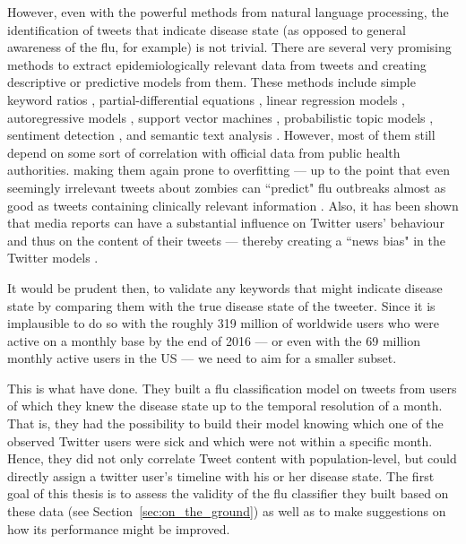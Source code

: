 \documentclass[11pt, a4paper,twoside]{report}\usepackage[]{graphicx}\usepackage[]{color}
\begin{document}
However, even with the powerful methods from natural language processing, the identification of tweets that indicate disease state (as opposed to general awareness of the flu, for example) is not trivial. There are several very promising methods to extract epidemiologically relevant data from tweets and creating descriptive or predictive models from them. These methods include simple keyword ratios \citep{lampos_tracking_2010}, partial-differential equations \citep{wang_regional_2016}, linear regression models \citep{culotta_towards_2010}, autoregressive models \citep{achrekar_predicting_2011,paul_twitter_2014,paul_worldwide_2015}, support vector machines \citep{paul_you_2011}, probabilistic topic models \citep{paul_you_2011}, sentiment detection \citep{aramaki_twitter_2011}, and semantic text analysis \citep{lamb_separating_2013}. However, most of them still depend on some sort of correlation with official data from public health authorities. making them again prone to overfitting --- up to the point that even seemingly irrelevant tweets about zombies can ``predict" flu outbreaks almost as good as tweets containing clinically relevant information \citep{bodnar_validating_2013}. Also, it has been shown that media reports can have a substantial influence on Twitter users' behaviour and thus on the content of their tweets --- thereby creating a ``news bias" in the Twitter models \citep{aramaki_twitter_2011}.

It would be prudent then, to validate any keywords that might indicate disease state by comparing them with the true disease state of the tweeter. Since it is implausible to do so with the roughly 319 million of worldwide users who were active on a monthly base by the end of 2016 --- or even with the 69 million monthly active users in the US \citep{twitter_annual_2017} --- we need to aim for a smaller subset.

This is what \cite{bodnar_ground_2014} have done. They built a flu classification model on tweets from users of which they knew the disease state up to the temporal resolution of a month. That is, they had the possibility to build their model knowing which one of the observed Twitter users were sick and which were not within a specific month. Hence, they did not only correlate Tweet content with population-level, but could directly assign a twitter user's timeline with his or her disease state. The first goal of this thesis is to assess the validity of the flu classifier they built based on these data (see Section~\ref{sec:on_the_ground}) as well as to make suggestions on how its performance might be improved.
\end{document}
